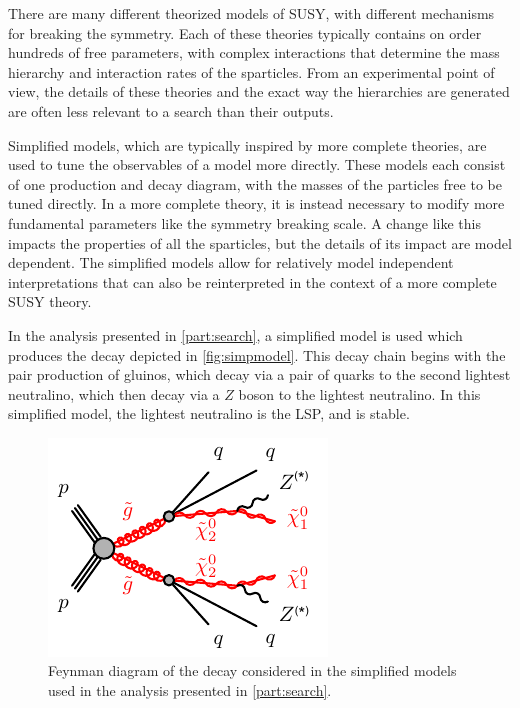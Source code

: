 There are many different theorized models of \ac{SUSY}, with different mechanisms for breaking the symmetry. Each of these theories typically contains on order hundreds of free parameters, with complex interactions that determine the mass hierarchy and interaction rates of the sparticles. From an experimental point of view, the details of these theories and the exact way the hierarchies are generated are often less relevant to a search than their outputs. 

Simplified models, which are typically inspired by more complete theories, are used to tune the observables of a model more directly. These models each consist of one production and decay diagram, with the masses of the particles free to be tuned directly. In a more complete theory, it is instead necessary to modify more fundamental parameters like the symmetry breaking scale. A change like this impacts the properties of all the sparticles, but the details of its impact are model dependent. The simplified models allow for relatively model independent interpretations that can also be reinterpreted in the context of a more complete \ac{SUSY} theory.

In the analysis presented in \autoref{part:search}, a simplified model is used which produces the decay depicted in \autoref{fig:simpmodel}. This decay chain begins with the pair production of gluinos, which decay via a pair of quarks to the second lightest neutralino, which then decay via a $Z$ boson to the lightest neutralino. In this simplified model, the lightest neutralino is the \ac{LSP}, and is stable.

\begin{centering}
\begin{figure}[!hbt]
\myfloatalign
\includegraphics[width=.9\linewidth]{figures/theory/gogo-qqqqZZN1N1.pdf}
\caption{Feynman diagram of the decay considered in the simplified models used in the analysis presented in \autoref{part:search}.}
\label{fig:simpmodel}
\end{figure}
\end{centering}

